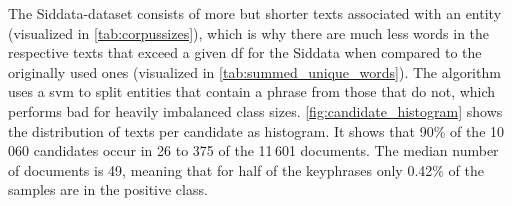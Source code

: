 \begingroup
\begin{table}[H]
\end{table}
\endgroup

The Siddata-dataset consists of more but shorter texts associated with an entity (visualized in \autoref{tab:corpussizes}), which is why there are much less words in the respective texts that exceed a given \gls{df} for the Siddata when compared to the originally used ones (visualized in \autoref{tab:summed_unique_words}). The algorithm uses a \gls{svm} to split entities that contain a phrase from those that do not, which performs bad for heavily imbalanced class sizes. \autoref{fig:candidate_histogram} shows the distribution of texts per candidate as histogram. It shows that 90\% of the 10\,060 candidates occur in 26 to 375 of the 11\,601 documents. The median number of documents is 49, meaning that for half of the keyphrases only 0.42\% of the samples are in the positive class.

